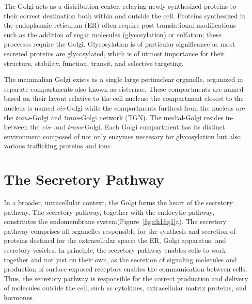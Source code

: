 The Golgi acts as a distribution center, relaying newly synthesized proteins to their correct destination both within and outside the cell. Proteins synthesized in the endoplasmic reticulum (ER) often require post-translational modifications such as the addition of sugar molecules (glycosylation) or sulfation; these processes require the Golgi\cite{potelle_golgi_2015}. Glycosylation is of particular significance as most secreted proteins are glycosylated, which is of utmost importance for their structure, stability, function, transit, and selective targeting\cite{dennis_adaptive_2009,haltiwanger_role_2004,hoseki_mechanism_2010,kollmann_mannose_2010,moremen_vertebrate_2012,rothman_coated_1980,varki_biological_1993,linders_sugary_2020}.

The mammalian Golgi exists as a single large perinuclear organelle, organized in separate compartments also known as cisternae\cite{cottam_retrograde_2012,papanikou_yeast_2009,jackson_mechanisms_2009}. These compartments are named based on their layout relative to the cell nucleus: the compartment closest to the nucleus is named \emph{cis}-Golgi while the compartments furthest from the nucleus are the \emph{trans}-Golgi and \emph{trans}-Golgi network (TGN). The medial-Golgi resides in-between the \emph{cis}- and \emph{trans}-Golgi. Each Golgi compartment has its distinct environment composed of not only enzymes necessary for glycosylation\cite{dejgaard_confocal_2007,freeze_golgi_2011,rabouille_mapping_1995,stanley_golgi_2011} but also various trafficking proteins\cite{linders_sugary_2020,linders_stx5-mediated_2019} and ions\cite{linders_sugary_2020,casey_sensors_2010,potelle_glycosylation_2016}.

\section{The Secretory Pathway}

In a broader, intracellular context, the Golgi forms the heart of the secretory pathway. The secretory pathway, together with the endocytic pathway, constitutes the endomembrane system\cite{alberts_essential_2019,lodish_molecular_2016}(Figure~\ref{fig:ch1fig1}a). The secretory pathway comprises all organelles responsible for the synthesis and secretion of proteins destined for the extracellular space: the ER, Golgi apparatus, and secretory vesicles. In principle, the secretory pathway enables cells to work together and not just on their own, as the secretion of signaling molecules and production of surface exposed receptors enables the communication between cells. Thus, the secretory pathway is responsible for the correct production and delivery of molecules outside the cell, such as cytokines, extracellular matrix proteins, and hormones.

